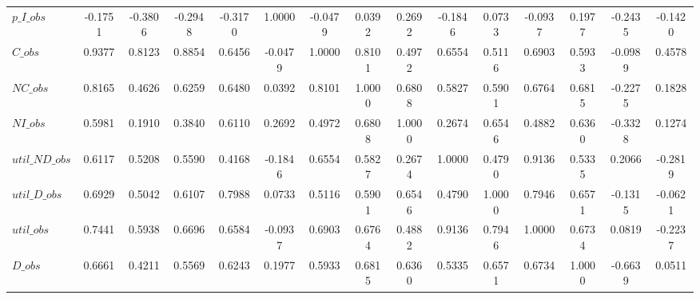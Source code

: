 \begin{center}
\begin{longtable}{lcccccccccccccc}
$p\_I\_obs      $	 & 	          -0.1751	 & 	          -0.3806	 & 	          -0.2948	 & 	          -0.3170	 & 	           1.0000	 & 	          -0.0479	 & 	           0.0392	 & 	           0.2692	 & 	          -0.1846	 & 	           0.0733	 & 	          -0.0937	 & 	           0.1977	 & 	          -0.2435	 & 	          -0.1420 \\ 
$C\_obs         $	 & 	           0.9377	 & 	           0.8123	 & 	           0.8854	 & 	           0.6456	 & 	          -0.0479	 & 	           1.0000	 & 	           0.8101	 & 	           0.4972	 & 	           0.6554	 & 	           0.5116	 & 	           0.6903	 & 	           0.5933	 & 	          -0.0989	 & 	           0.4578 \\ 
$NC\_obs        $	 & 	           0.8165	 & 	           0.4626	 & 	           0.6259	 & 	           0.6480	 & 	           0.0392	 & 	           0.8101	 & 	           1.0000	 & 	           0.6808	 & 	           0.5827	 & 	           0.5901	 & 	           0.6764	 & 	           0.6815	 & 	          -0.2275	 & 	           0.1828 \\ 
$NI\_obs        $	 & 	           0.5981	 & 	           0.1910	 & 	           0.3840	 & 	           0.6110	 & 	           0.2692	 & 	           0.4972	 & 	           0.6808	 & 	           1.0000	 & 	           0.2674	 & 	           0.6546	 & 	           0.4882	 & 	           0.6360	 & 	          -0.3328	 & 	           0.1274 \\ 
$util\_ND\_obs  $	 & 	           0.6117	 & 	           0.5208	 & 	           0.5590	 & 	           0.4168	 & 	          -0.1846	 & 	           0.6554	 & 	           0.5827	 & 	           0.2674	 & 	           1.0000	 & 	           0.4790	 & 	           0.9136	 & 	           0.5335	 & 	           0.2066	 & 	          -0.2819 \\ 
$util\_D\_obs   $	 & 	           0.6929	 & 	           0.5042	 & 	           0.6107	 & 	           0.7988	 & 	           0.0733	 & 	           0.5116	 & 	           0.5901	 & 	           0.6546	 & 	           0.4790	 & 	           1.0000	 & 	           0.7946	 & 	           0.6571	 & 	          -0.1315	 & 	          -0.0621 \\ 
$util\_obs      $	 & 	           0.7441	 & 	           0.5938	 & 	           0.6696	 & 	           0.6584	 & 	          -0.0937	 & 	           0.6903	 & 	           0.6764	 & 	           0.4882	 & 	           0.9136	 & 	           0.7946	 & 	           1.0000	 & 	           0.6734	 & 	           0.0819	 & 	          -0.2237 \\ 
$D\_obs         $	 & 	           0.6661	 & 	           0.4211	 & 	           0.5569	 & 	           0.6243	 & 	           0.1977	 & 	           0.5933	 & 	           0.6815	 & 	           0.6360	 & 	           0.5335	 & 	           0.6571	 & 	           0.6734	 & 	           1.0000	 & 	          -0.6639	 & 	           0.0511 \\ 

\end{longtable}
\end{center}
